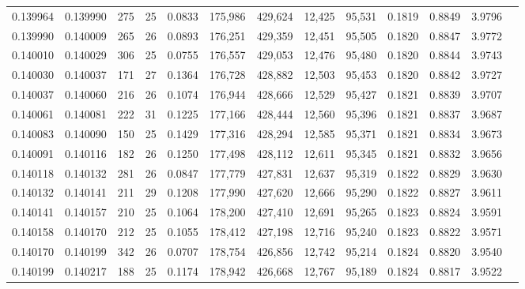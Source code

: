 \begin{tabular}{rrrrrrrrrrrrr}
0.139964 & 0.139990 & 275 &  25 &                                     0.0833 & 175,986 & 429,624 &  12,425 &  95,531 & 0.1819 & 0.8849 & 3.9796 \\
0.139990 & 0.140009 & 265 &  26 &                                     0.0893 & 176,251 & 429,359 &  12,451 &  95,505 & 0.1820 & 0.8847 & 3.9772 \\
0.140010 & 0.140029 & 306 &  25 &                                     0.0755 & 176,557 & 429,053 &  12,476 &  95,480 & 0.1820 & 0.8844 & 3.9743 \\
0.140030 & 0.140037 & 171 &  27 &                                     0.1364 & 176,728 & 428,882 &  12,503 &  95,453 & 0.1820 & 0.8842 & 3.9727 \\
0.140037 & 0.140060 & 216 &  26 &                                     0.1074 & 176,944 & 428,666 &  12,529 &  95,427 & 0.1821 & 0.8839 & 3.9707 \\
0.140061 & 0.140081 & 222 &  31 &                                     0.1225 & 177,166 & 428,444 &  12,560 &  95,396 & 0.1821 & 0.8837 & 3.9687 \\
0.140083 & 0.140090 & 150 &  25 &                                     0.1429 & 177,316 & 428,294 &  12,585 &  95,371 & 0.1821 & 0.8834 & 3.9673 \\
0.140091 & 0.140116 & 182 &  26 &                                     0.1250 & 177,498 & 428,112 &  12,611 &  95,345 & 0.1821 & 0.8832 & 3.9656 \\
0.140118 & 0.140132 & 281 &  26 &                                     0.0847 & 177,779 & 427,831 &  12,637 &  95,319 & 0.1822 & 0.8829 & 3.9630 \\
0.140132 & 0.140141 & 211 &  29 &                                     0.1208 & 177,990 & 427,620 &  12,666 &  95,290 & 0.1822 & 0.8827 & 3.9611 \\
0.140141 & 0.140157 & 210 &  25 &                                     0.1064 & 178,200 & 427,410 &  12,691 &  95,265 & 0.1823 & 0.8824 & 3.9591 \\
0.140158 & 0.140170 & 212 &  25 &                                     0.1055 & 178,412 & 427,198 &  12,716 &  95,240 & 0.1823 & 0.8822 & 3.9571 \\
0.140170 & 0.140199 & 342 &  26 &                                     0.0707 & 178,754 & 426,856 &  12,742 &  95,214 & 0.1824 & 0.8820 & 3.9540 \\
0.140199 & 0.140217 & 188 &  25 &                                     0.1174 & 178,942 & 426,668 &  12,767 &  95,189 & 0.1824 & 0.8817 & 3.9522 \\

\end{tabular}
